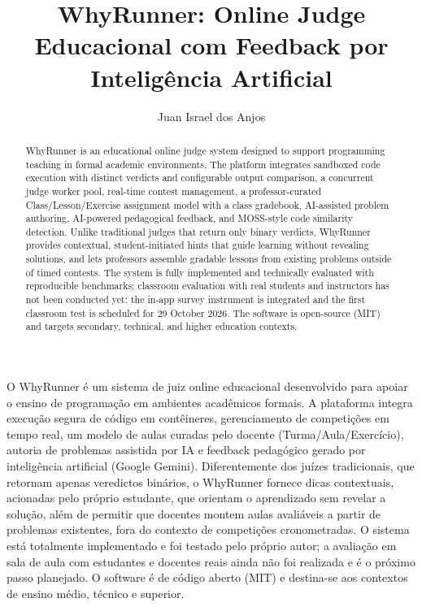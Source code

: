 \documentclass[12pt]{article}
\title{WhyRunner: Online Judge Educacional com Feedback por Inteligência Artificial}
\author{Juan Israel dos Anjos\inst{1}}
\begin{document}
\maketitle

\begin{abstract}
WhyRunner is an educational online judge system designed to support programming
teaching in formal academic environments. The platform integrates sandboxed code execution with distinct verdicts and
configurable output comparison, a concurrent judge worker pool, real-time
contest management, a professor-curated Class/Lesson/Exercise assignment model
with a class gradebook, AI-assisted problem authoring, AI-powered pedagogical
feedback, and MOSS-style code similarity detection. Unlike traditional judges
that return only binary verdicts, WhyRunner provides contextual, student-initiated
hints that guide learning without revealing solutions, and lets professors assemble
gradable lessons from existing problems outside of timed contests. The system is
fully implemented and technically evaluated with reproducible benchmarks;
classroom evaluation with real students and instructors has not been conducted
yet: the in-app survey instrument is integrated and the first classroom test is
scheduled for 29 October 2026.
The software is open-source (MIT) and targets secondary, technical, and higher
education contexts.
\end{abstract}

\begin{resumo}
O WhyRunner é um sistema de juiz online educacional desenvolvido para apoiar o
ensino de programação em ambientes acadêmicos formais. A plataforma integra
execução segura de código em contêineres, gerenciamento de competições em tempo
real, um modelo de aulas curadas pelo docente (Turma/Aula/Exercício), autoria de
problemas assistida por IA e feedback pedagógico gerado por inteligência
artificial (Google Gemini). Diferentemente dos juízes tradicionais, que retornam
apenas veredictos binários, o WhyRunner fornece dicas contextuais, acionadas pelo
próprio estudante, que orientam o aprendizado sem revelar a solução, além de
permitir que docentes montem aulas avaliáveis a partir de problemas existentes,
fora do contexto de competições cronometradas. O sistema está totalmente
implementado e foi testado pelo próprio autor; a avaliação em sala de aula com
estudantes e docentes reais ainda não foi realizada e é o próximo passo
planejado. O software é de código aberto (MIT) e destina-se aos contextos de
ensino médio, técnico e superior.
\end{resumo}
\end{document}
